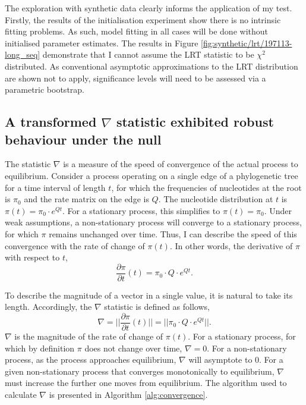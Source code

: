 

The exploration with synthetic data clearly informs the application of my test. Firstly, the results of the initialisation experiment show there is no intrinsic fitting problems. As such, model fitting in all cases will be done without initialised parameter estimates. The results in Figure \ref{fig:synthetic/lrt/197113-long_seq} demonstrate that I cannot assume the LRT statistic to be $\chi^{2}$ distributed. As conventional asymptotic approximations to the LRT distribution are shown not to apply, significance levels will need to be assessed via a parametric bootstrap. 

\subsection*{A transformed $\nabla$ statistic exhibited robust behaviour under the null}

The statistic $\nabla$ is a measure of the speed of convergence of the actual process to equilibrium. Consider a process operating on a single edge of a phylogenetic tree for a time interval of length $t$, for which the frequencies of nucleotides at the root is $\pi_0$ and the rate matrix on the edge is $Q$. The nucleotide distribution at $t$ is $\pi(t) = \pi_{0} \cdot e^{Qt}$. For a stationary process, this simplifies to $\pi(t) = \pi_{0}$. Under weak assumptions, a non-stationary process will converge to a stationary process, for which $\pi$ remains unchanged over time. Thus, I can describe the speed of this convergence with the rate of change of $\pi(t)$. In other words, the derivative of $\pi$ with respect to $t$,
\begin{equation}
\label{eq:dpi/dt}
\frac{\partial \pi}{\partial t}(t) = \pi_{0} \cdot Q \cdot e^{Qt}.
\end{equation}

To describe the magnitude of a vector in a single value, it is natural to take its length. Accordingly, the $\nabla$ statistic is defined as follows,
\begin{equation}
\label{eq:len-dpi/dt}
\nabla = ||\frac{\partial \pi}{\partial t}(t)|| =|| \pi_{0} \cdot Q \cdot e^{Qt}||.
\end{equation}
$\nabla$ is the magnitude of the rate of change of $\pi(t)$. For a stationary process, for which by definition $\pi$ does not change over time, $\nabla = 0$. For a non-stationary process, as the process approaches equilibrium, $\nabla$ will asymptote to $0$. For a given non-stationary process that converges monotonically to equilibrium, $\nabla$ must increase the further one moves from equilibrium. The algorithm used to calculate $\nabla$ is presented in Algorithm \ref{alg:convergence}.

